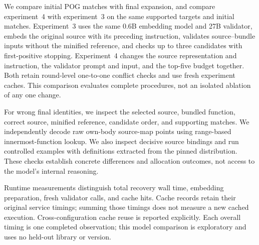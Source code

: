 We compare initial POG matches with final expansion, and compare experiment~4 with experiment~3 on the same supported targets and initial matches. Experiment~3 uses the same 0.6B embedding model and 27B validator, embeds the original source with its preceding instruction, validates source--bundle inputs without the minified reference, and checks up to three candidates with first-positive stopping. Experiment~4 changes the source representation and instruction, the validator prompt and input, and the top-five budget together. Both retain round-level one-to-one conflict checks and use fresh experiment caches. This comparison evaluates complete procedures, not an isolated ablation of any one change.

For wrong final identities, we inspect the selected source, bundled function, correct source, minified reference, candidate order, and supporting matches. We independently decode raw own-body source-map points using range-based innermost-function lookup. We also inspect decisive source bindings and run controlled examples with definitions extracted from the pinned distribution. These checks establish concrete differences and allocation outcomes, not access to the model's internal reasoning.

Runtime measurements distinguish total recovery wall time, embedding preparation, fresh validator calls, and cache hits. Cache records retain their original service timings; summing those timings does not measure a new cached execution. Cross-configuration cache reuse is reported explicitly. Each overall timing is one completed observation; this model comparison is exploratory and uses no held-out library or version.
